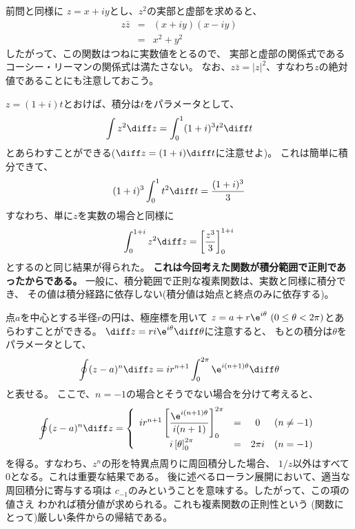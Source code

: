 前問と同様に
$z = x+ iy$とし、$z^2$の実部と虚部を求めると、
\begin{eqnarray}
  z\bar{z} &=& (x+iy)(x-iy)\\
  &=& x^2 + y^2
\end{eqnarray}
したがって、この関数はつねに実数値をとるので、
実部と虚部の関係式であるコーシー・リーマンの関係式は満たさない。
なお、$z \bar{z} = |z|^2$、すなわち$z$の絶対値であることにも注意しておこう。


$z = (1+i)t$とおけば、積分は$t$をパラメータとして、
$$
  \int z^2 \diff z = \int_0^1 (1+i)^3 t^2  \diff t
$$
とあらわすことができる($\diff z = (1+i) \diff t$に注意せよ)。
これは簡単に積分できて、
$$
  (1+i)^3 \int_0^1 t^2  \diff t = \frac{(1+i)^3}{3}
$$
すなわち、単に$z$を実数の場合と同様に
$$
  \int_0^{1+i} z^2 \diff z = \left[ \frac{z^3}{3}  \right]_0^{1+i}
$$
とするのと同じ結果が得られた。
{\bf これは今回考えた関数が積分範囲で正則であったからである。}
一般に、積分範囲で正則な複素関数は、実数と同様に積分でき、
その値は積分経路に依存しない(積分値は始点と終点のみに依存する)。

点$a$を中心とする半径$r$の円は、極座標を用いて
$z = a + r\e^{i\theta} ~(0 \le \theta < 2\pi)$とあらわすことができる。
$\diff z = ri \e^{i\theta} \diff \theta$に注意すると、
もとの積分は$\theta$をパラメータとして、
\begin{equation}
  \oint (z-a)^n \diff z = i r^{n+1} \int_0^{2\pi} \e^{i(n+1)\theta} \diff \theta
\end{equation}
と表せる。
ここで、$n = -1$の場合とそうでない場合を分けて考えると、
\begin{equation}
  \oint (z-a)^n \diff z =
  \left\{
  \begin{array}{cccc}
    i r^{n+1} \left[ \displaystyle\frac{\e^{i(n+1)\theta}}{i(n+1)} \right]_0^{2\pi} & = & 0      & (n \neq -1) \\
    i \left[ \theta  \right]_0^{2\pi}                                               & = & 2\pi i & (n=-1)
  \end{array}
  \right.
\end{equation}
を得る。すなわち、$z^n$の形を特異点周りに周回積分した場合、
$1/z$以外はすべて$0$となる。これは重要な結果である。
後に述べるローラン展開において、適当な周回積分に寄与する項は
$c_{-1}$のみということを意味する。したがって、この項の値さえ
わかれば積分値が求められる。これも複素関数の正則性という
(関数にとって)厳しい条件からの帰結である。


